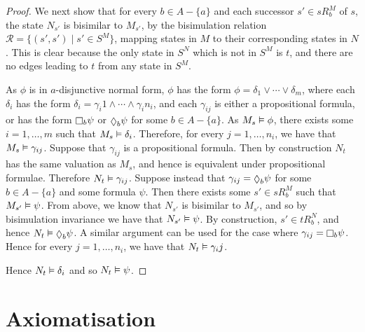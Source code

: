 \begin{proof}
We next show that for every $b \in A - \{a\}$ and each successor $s' \in sR^M_b$
of $s$, the state $N_{s'}$ is bisimilar to $M_{s'}$, by the bisimulation
relation $\mathcal{R} = \{(s', s') \mid s' \in S^M \}$, mapping states in
$M$ to their corresponding states in $N$. This is clear because the only state
in $S^N$ which is not in $S^M$ is $t$, and there are no edges leading to $t$
from any state in $S^M$.

As $\phi$ is in $a$-disjunctive normal form, $\phi$ has the form $\phi =
\delta_1 \lor \cdots \lor \delta_m$, where each $\delta_i$ has the form
$\delta_i = \gamma_i1 \land \cdots \land \gamma_i{n_i}$, and each $\gamma_{ij}$ is
either a propositional formula, or has the form $\knows_b \psi$ or $\suspects_b
\psi$ for some $b \in A - \{a\}$.  As $M_s \vDash \phi$, there exists some $i
= 1, \dots, m$ such that $M_s \vDash \delta_i$. Therefore, for every $j = 1,
\dots, n_i$, we have that $M_s \vDash \gamma_{ij}$.  Suppose that
$\gamma_{ij}$ is a propositional formula. Then by construction $N_t$ has the
same valuation as $M_s$, and hence is equivalent under propositional formulae.
Therefore $N_t \vDash \gamma_{ij}$.  Suppose instead that $\gamma_{ij} =
\suspects_b \psi$ for some $b \in A - \{a\}$ and some formula $\psi$. Then there
exists some $s' \in sR^M_b$ such that $M_{s'} \vDash \psi$. From above, we
know that $N_{s'}$ is bisimilar to $M_{s'}$, and so by bisimulation invariance
we have that $N_{s'} \vDash \psi$.  By construction, $s' \in tR^N_b$, and
hence $N_t \entails \suspects_b \psi$. A similar argument can be used for the
case where $\gamma_{ij} = \knows_b \psi$. Hence for every $j = 1, \dots, n_i$, we
have that $N_t \vDash \gamma_ij$.

Hence $N_t \vDash \delta_i$ and so $N_t \vDash \psi$.
\end{proof}

\section{Axiomatisation}


